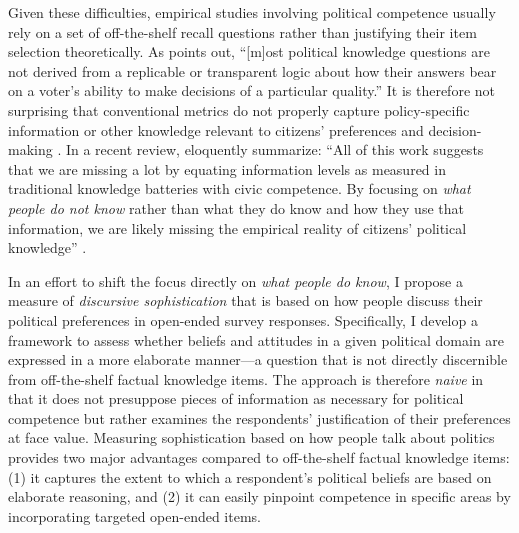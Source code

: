 Given these difficulties, empirical studies involving political competence usually rely on a set of off-the-shelf recall questions rather than justifying their item selection theoretically. As \citet[219]{lupia2006elitism} points out, ``[m]ost political knowledge questions are not derived from a replicable or transparent logic about how their answers bear on a voter's ability to make decisions of a particular quality.'' It is therefore not surprising that conventional metrics do not properly capture policy-specific information \citep{gilens2001political} or other knowledge relevant to citizens' preferences and decision-making \citep[43--68]{graber2001processing}. In a recent review, \citeauthor{cramer2017fact} eloquently summarize: ``All of this work suggests that we are missing a lot by equating information levels as measured in traditional knowledge batteries with civic competence. By focusing on \textit{what people do not know} rather than what they do know and how they use that information, we are likely missing the empirical reality of citizens' political knowledge'' \citeyearpar[756, emphasis added]{cramer2017fact}.

In an effort to shift the focus directly on \textit{what people do know}, I propose a measure of \textit{discursive sophistication} that is based on how people discuss their political preferences in open-ended survey responses. Specifically, I develop a framework to assess whether beliefs and attitudes in a given political domain are expressed in a more elaborate manner---a question that is not directly discernible from off-the-shelf factual knowledge items. The approach is therefore \textit{naive} in that it does not presuppose pieces of information as necessary for political competence but rather examines the respondents' justification of their preferences at face value. Measuring sophistication based on how people talk about politics provides two major advantages compared to off-the-shelf factual knowledge items: (1) it captures the extent to which a respondent's political beliefs are based on elaborate reasoning, and (2) it can easily pinpoint competence in specific areas by incorporating targeted open-ended items.

